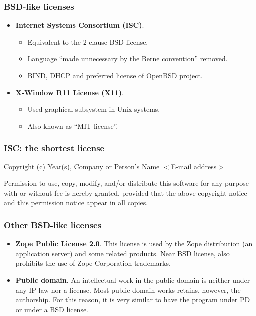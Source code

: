 \begin{frame}
\frametitle{BSD-like licenses}

\begin{itemize}

\item {\bf Internet Systems Consortium (ISC)}. 
	\begin{itemize}
	\item Equivalent to the 2-clause BSD license.
	\item Language ``made unnecessary by the Berne convention'' removed.
	\item BIND, DHCP and preferred license of OpenBSD project.
	\end{itemize}
\item {\bf X-Window R11 License (X11)}. 
	\begin{itemize}
	\item Used graphical subsystem in Unix systems. 
	\item Also known as ``MIT license''. 
	\end{itemize}
\end{itemize}

\end{frame}


\begin{frame}
\frametitle{ISC: the shortest license}

{\small Copyright (c) Year(s), Company or Person's Name $<$E-mail address$>$} \\

\medskip

\alert{Permission} to \alert{use}, \alert{copy}, \alert{modify}, and/or \alert{distribute} this software for any
purpose with or without fee is hereby granted, provided that the above
copyright notice and this permission notice appear in all copies.

\end{frame}



\begin{frame}
\frametitle{Other BSD-like licenses}

{\small
\begin{itemize}

\item {\bf Zope Public License 2.0}. This license is used by the Zope
  distribution (an application server) and some related products. Near
  BSD license, also prohibits the use of Zope Corporation trademarks.

\item {\bf Public domain}. An intellectual work in the public domain
  is neither under any IP law nor a license. Most public domain works
  retains, however, the authorship. For this reason, it is very
  similar to have the program under PD or under a BSD license.

\end{itemize}
}

\end{frame}



